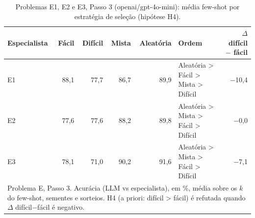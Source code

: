 \begin{table}[htbp]
\centering
\small
\caption{Problemas E1, E2 e E3, Passo 3 (openai/gpt-4o-mini): média few-shot por estratégia de seleção (hipótese H4).}
\label{tab:bloco2_E_passo3_H4_gpt4mini}
\begin{tabular}{lrrrrlr}
\toprule
Especialista & Fácil & Difícil & Mista & Aleatória & Ordem & $\Delta$ difícil $-$ fácil \\
\midrule
E1 & 88,1 & 77,7 & 86,7 & 89,9 & Aleatória > Fácil > Mista > Difícil & $-$10,4 \\
E2 & 77,6 & 77,6 & 88,2 & 89,8 & Aleatória > Mista > Fácil > Difícil & $-$0,0 \\
E3 & 78,1 & 71,0 & 90,2 & 91,6 & Aleatória > Mista > Fácil > Difícil & $-$7,1 \\
\bottomrule
\multicolumn{7}{p{0.95\linewidth}}{\footnotesize Problema E, Passo 3. Acurácia (LLM vs especialista), em \%, média sobre os $k$ do few-shot, sementes e sorteios. H4 (a priori: difícil > fácil) é refutada quando $\Delta$ difícil$-$fácil é negativo.} \\
\end{tabular}
\end{table}

